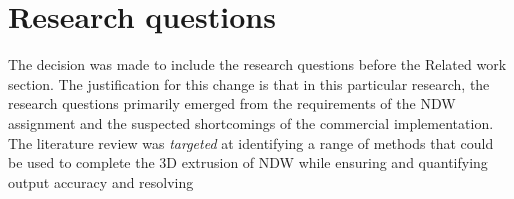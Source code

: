 
\chapter{Research questions}
\label{chap:rq}

The decision was made to include the research questions before the Related work section. The justification for this change is that in this particular research, the research questions primarily emerged from the requirements of the NDW assignment and the suspected shortcomings of the commercial implementation. The literature review was \textit{targeted} at identifying a range of methods that could be used to complete the 3D extrusion of NDW while ensuring and quantifying output accuracy and resolving 